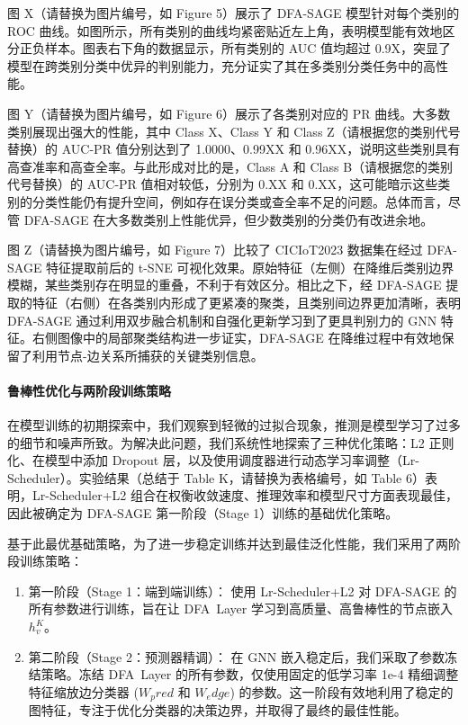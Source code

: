 \documentclass{article}
\begin{document}
图 X（请替换为图片编号，如 Figure 5）展示了 DFA-SAGE 模型针对每个类别的 ROC 曲线。如图所示，所有类别的曲线均紧密贴近左上角，表明模型能有效地区分正负样本。图表右下角的数据显示，所有类别的 AUC 值均超过 0.9X，突显了模型在跨类别分类中优异的判别能力，充分证实了其在多类别分类任务中的高性能。

图 Y（请替换为图片编号，如 Figure 6）展示了各类别对应的 PR 曲线。大多数类别展现出强大的性能，其中 Class X、Class Y 和 Class Z（请根据您的类别代号替换）的 AUC-PR 值分别达到了 1.0000、0.99XX 和 0.96XX，说明这些类别具有高查准率和高查全率。与此形成对比的是，Class A 和 Class B（请根据您的类别代号替换）的 AUC-PR 值相对较低，分别为 0.XX 和 0.XX，这可能暗示这些类别的分类性能仍有提升空间，例如存在误分类或查全率不足的问题。总体而言，尽管 DFA-SAGE 在大多数类别上性能优异，但少数类别的分类仍有改进余地。

图 Z（请替换为图片编号，如 Figure 7）比较了 CICIoT2023 数据集在经过 DFA-SAGE 特征提取前后的 t-SNE 可视化效果。原始特征（左侧）在降维后类别边界模糊，某些类别存在明显的重叠，不利于有效区分。相比之下，经 DFA-SAGE 提取的特征（右侧）在各类别内形成了更紧凑的聚类，且类别间边界更加清晰，表明 DFA-SAGE 通过利用双步融合机制和自强化更新学习到了更具判别力的 GNN 特征。右侧图像中的局部聚类结构进一步证实，DFA-SAGE 在降维过程中有效地保留了利用节点-边关系所捕获的关键类别信息。

\paragraph{鲁棒性优化与两阶段训练策略}

在模型训练的初期探索中，我们观察到轻微的过拟合现象，推测是模型学习了过多的细节和噪声所致。为解决此问题，我们系统性地探索了三种优化策略：L2 正则化、在模型中添加 Dropout 层，以及使用调度器进行动态学习率调整（Lr-Scheduler）。实验结果（总结于 Table K，请替换为表格编号，如 Table 6）表明，Lr-Scheduler+L2 组合在权衡收敛速度、推理效率和模型尺寸方面表现最佳，因此被确定为 DFA-SAGE 第一阶段（Stage 1）训练的基础优化策略。

基于此最优基础策略，为了进一步稳定训练并达到最佳泛化性能，我们采用了两阶段训练策略：

\begin{enumerate}
\item 第一阶段（Stage 1：端到端训练）： 使用 Lr-Scheduler+L2 对 DFA-SAGE 的所有参数进行训练，旨在让 DFA Layer 学习到高质量、高鲁棒性的节点嵌入$ h_v^K $。
\item 第二阶段（Stage 2：预测器精调）： 在 GNN 嵌入稳定后，我们采取了参数冻结策略。冻结 DFA Layer 的所有参数，仅使用固定的低学习率 1e-4 精细调整特征缩放边分类器 ($W_pred$ 和 $W_edge$) 的参数。这一阶段有效地利用了稳定的图特征，专注于优化分类器的决策边界，并取得了最终的最佳性能。
\end{enumerate}
\end{document}
